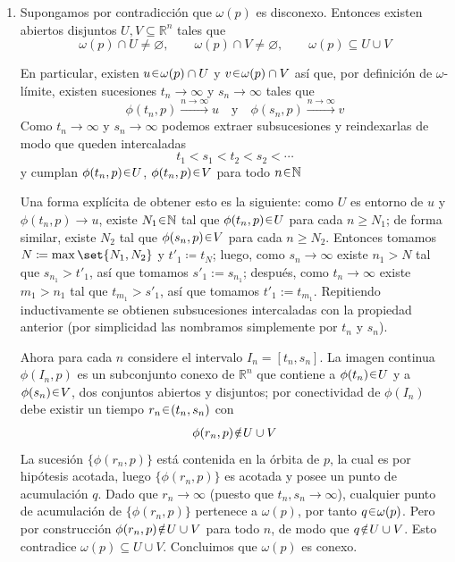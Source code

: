 \begin{sol}
\begin{enumerate}[label=\textbf{(\alph*)}]

\item{}
Supongamos por contradicción que $\omega(p)$ es disconexo. Entonces existen abiertos disjuntos $U,V\subseteq\mathbb{R}^n$ tales que
\[
\omega(p)\cap U\neq\varnothing,%
\qquad \omega(p)\cap V\neq\varnothing,%
\qquad \omega(p)\subseteq U\cup V
\]


En particular, existen $u\en\omega(p)\cap U$ y $v\en\omega(p)\cap V$ así que, por definición de $\omega$-límite, existen sucesiones $t_n\to\infty$ y $s_n\to\infty$ tales que 
\[
\phi(t_n,p) \xrightarrow{n\to\infty} u
\quad\text{y}\quad
\phi(s_n,p) \xrightarrow{n\to\infty} v
\]
Como $t_n\to\infty$ y $s_n\to\infty$ podemos extraer subsucesiones y reindexarlas de modo que queden intercaladas
\[t_1<s_1<t_2<s_2<\cdots\]
y cumplan $\phi(t_n,p)\en U$, $\phi(t_n,p)\en V$ para todo $n\en\mathbb{N}$

Una forma explícita de obtener esto es la siguiente: como $U$ es entorno de $u$ y $\phi(t_n,p) \to u$, existe $N_1 \en \mathbb{N}$ tal que $\phi(t_n,p) \en U$ para cada $n \geq N_1$; de forma similar, existe $N_2$ tal que $\phi(s_n,p) \en V$ para cada $n\geq N_2$. Entonces tomamos $N \coloneq \max\set{N_1,N_2}$ y $t'_1 \coloneq t_{N}$; luego, como $s_n\to\infty$ existe $n_1>N$ tal que $s_{n_1}>t'_1$, así que tomamos $s'_1:=s_{n_1}$; después, como $t_n\to\infty$ existe $m_1>n_1$ tal que $t_{m_1}>s'_1$, así que tomamos $t'_1:=t_{m_1}$. Repitiendo inductivamente se obtienen subsucesiones intercaladas con la propiedad anterior (por simplicidad las nombramos simplemente por $t_n$ y $s_n$).

Ahora para cada $n$ considere el intervalo $I_n=[t_n,s_n]$. La imagen continua $\phi(I_n,p)$ es un subconjunto conexo de $\mathbb{R}^n$ que contiene a $\phi(t_n)\en U$ y a $\phi(s_n)\en V$, dos conjuntos abiertos y disjuntos; por conectividad de $\phi(I_n)$ debe existir un tiempo $r_n\en(t_n,s_n)$ con
\[\phi(r_n,p)\noten U\cup V\]
La sucesión $\{\phi(r_n,p)\}$ está contenida en la órbita de $p$, la cual es por hipótesis acotada, luego $\{\phi(r_n,p)\}$ es acotada y posee un punto de acumulación $q$. Dado que $r_n\to\infty$ (puesto que $t_n,s_n\to\infty$), cualquier punto de acumulación de $\{\phi(r_n,p)\}$ pertenece a $\omega(p)$, por tanto $q\en\omega(p)$. Pero por construcción $\phi(r_n,p)\noten U\cup V$ para todo $n$, de modo que $q\noten U\cup V$. Esto contradice $\omega(p)\subseteq U\cup V$. Concluimos que $\omega(p)$ es conexo.


\end{enumerate}
\end{sol}
